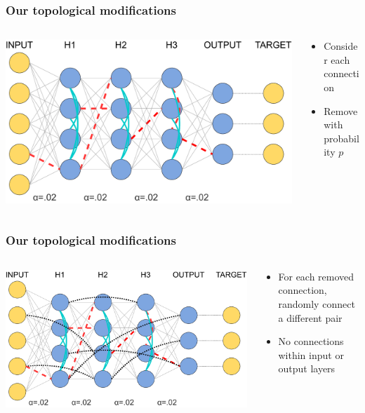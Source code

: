 \documentclass[pdf]{beamer}
\begin{document}
\begin{frame}
	\frametitle{Our topological modifications}
	\begin{columns}
		\begin{column}{.6\textwidth}
			\includegraphics[width=\textwidth]{figures/topology_changes_step3.pdf}
		\end{column}
		\begin{column}{.4\textwidth}
			\begin{itemize}
			\item<1-> Consider each connection
			\item<2-> Remove with probability $p$
			\end{itemize}
		\end{column}
	\end{columns}
\end{frame}
\begin{frame}
	\frametitle{Our topological modifications}
	\begin{columns}
		\begin{column}{.6\textwidth}
			\includegraphics[width=\textwidth]{figures/topology_changes_step4.pdf}
		\end{column}
		\begin{column}{.4\textwidth}
			\begin{itemize}
			\item<1-> For each removed connection, randomly connect a different pair
			\item<2-> No connections within input or output layers
			\end{itemize}
		\end{column}
	\end{columns}
\end{frame}
\end{document}
